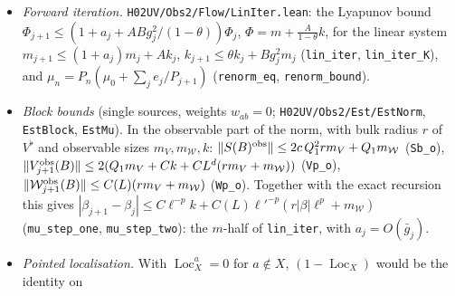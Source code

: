 \documentclass[11pt]{amsart}
\theoremstyle{definition}
\theoremstyle{remark}
\numberwithin{equation}{section}
\newcommand{\E}{\mathbb{E}}
\newcommand{\Loc}{\operatorname{Loc}}
\begin{document}
\begin{itemize}
  $m_1F_C(\bar\psi_a,V_\kappa(\Lambda))=\nu\sum_xC(a,x)$ and
  $m_2F_C(\bar\psi_a\psi_a,V_\kappa(\Lambda))=\nu\sum_x(C(a,x)+C(x,a))-g\,\mathfrak l_C(a)$,
  $\mathfrak l_C(a)=\sum_i\sum_z\frac12\sum_{e=\pm e_i}\nabla_eC(a,\cdot)(z)\,\nabla_eC(\cdot,a)(z)$
  (\texttt{mass1\_FC\_psibar\_Vcoup}, \texttt{mass2\_FC\_pbp\_Vcoup}, lifted to sources in \texttt{Wick2}).
  The per-block term $m(S(B_+)_a)$ is \emph{not} symmetric: $\frac12F_C(V'_{\rm bulk}(\Lambda\setminus B_+),V'_a)$
  stays in $\mathcal W^{\rm obs}$ of neighbouring blocks and is re-localised later. Summed over all blocks the
  localisation cancels (\texttt{total\_step}): $\sum_B[m(V_{j+1}(B)_a)-m(\mathcal W_{j+1}(B)_a)]$ equals
  $\sum_Bm(V'_{B,a})-\sum_Bm((\E\theta Q(B))_a)-m(F_C(V'(\Lambda)_a,V'(\Lambda)_\varnothing))-\sum_Bm((\E\theta\mathcal W(B))_a)$,
  with the symmetric one-loop term evaluated in \texttt{total\_FC\_one}, \texttt{total\_FC\_two}. So the
  flow equations above hold for $\mu+w$, $w$ the total $\mathcal W^{\rm obs}$ mass coefficient. For a
  translation-invariant even covariance $C(x,y)=c(y-x)$, $\mathfrak l_C(a)=\sum_xc(x)((-\Delta)c)(x)=\mathfrak l(C)$
  (summation by parts). Not done:
  the dressed $\mathfrak l_j$ and the tadpole part $-(\nu'-\nu)w^{(1)}$ of $\mathfrak n_j$ inside
  $m((\E\theta\mathcal W)_a)$.
\item \emph{Forward iteration.} \texttt{H02UV/Obs2/Flow/LinIter.lean}: the Lyapunov bound
  $\Phi_{j+1}\le(1+a_j+ABg_j^2/(1-\theta))\Phi_j$, $\Phi=m+\frac A{1-\theta}k$, for the linear system
  $m_{j+1}\le(1+a_j)m_j+Ak_j$, $k_{j+1}\le\theta k_j+Bg_j^2m_j$ (\texttt{lin\_iter}, \texttt{lin\_iter\_K}),
  and $\mu_n=P_n(\mu_0+\sum_je_j/P_{j+1})$ (\texttt{renorm\_eq}, \texttt{renorm\_bound}).
\item \emph{Block bounds} (single sources, weights $w_{ab}=0$; \texttt{H02UV/Obs2/Est/EstNorm}, \texttt{EstBlock},
  \texttt{EstMu}). In the observable part of the norm, with bulk radius $r$ of $V^\flat$ and observable
  sizes $m_V,m_{\mathcal W},k$: $\|S(B)^{\rm obs}\|\le 2c\,Q_1^2rm_V+Q_1m_{\mathcal W}$ (\texttt{Sb\_o}),
  $\|V^{\rm obs}_{j+1}(B)\|\le 2(Q_1m_V+Ck+CL^d(rm_V+m_{\mathcal W}))$ (\texttt{Vp\_o}),
  $\|\mathcal W^{\rm obs}_{j+1}(B)\|\le C(L)(rm_V+m_{\mathcal W})$ (\texttt{Wp\_o}). Together with the exact
  recursion this gives $|\beta_{j+1}-\beta_j|\le C\ell^{-p}k+C(L)\ell'^{-p}(r|\beta|\ell^p+m_{\mathcal W})$
  (\texttt{mu\_step\_one}, \texttt{mu\_step\_two}): the $m$-half of \texttt{lin\_iter}, with $a_j=O(\bar g_j)$.
\item \emph{Pointed localisation.} With $\Loc^a_X=0$ for $a\notin X$, $(1-\Loc_X)$ would be the identity on

\end{itemize}
\end{document}

